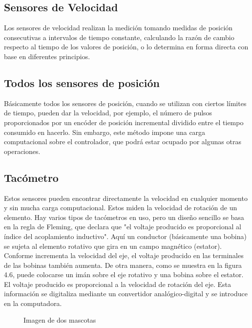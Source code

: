 \subsection{\textbf{Sensores de Velocidad}}
Los sensores de velocidad realizan la medición tomando medidas de posición consecutivas a intervalos de tiempo constante, calculando la razón de cambio respecto al tiempo de los valores de posición, o lo determina en forma directa con base en diferentes principios.

\subsection*{\quad\textbf{Todos los sensores de posición}}
Básicamente todos los sensores de posición, cuando se utilizan con ciertos límites de tiempo, pueden dar la velocidad, por ejemplo, el número de pulsos proporcionados por un encóder de posición incremental dividido entre el tiempo consumido en hacerlo. Sin embargo, este método impone una carga computacional sobre el controlador, que podrá estar ocupado por algunas otras operaciones.


\subsection*{\quad\textbf{Tacómetro}}
Estos sensores pueden encontrar directamente la velocidad en cualquier momento y sin mucha carga computacional. Estos miden la velocidad de rotación de un elemento. Hay varios tipos de tacómetros en uso, pero un diseño sencillo se basa en la regla de Fleming, que declara que "el voltaje producido es proporcional al índice del acoplamiento inductivo". Aquí un conductor (básicamente una bobina) se sujeta al elemento rotativo que gira en un campo magnético (estator). Conforme incrementa la velocidad del eje, el voltaje producido en las terminales de las bobinas también aumenta. De otra manera, como se muestra en la figura 4.6, puede colocarse un imán sobre el eje rotativo y una bobina sobre el estator. El voltaje producido es proporcional a la velocidad de rotación del eje. Esta información se digitaliza mediante un convertidor analógico-digital y se introduce en la computadora.

\begin{figure}[h]
	\centering
	\qquad
	\caption{Imagen de dos mascotas}
	\label{fig:Tacómetro}
\end{figure}

